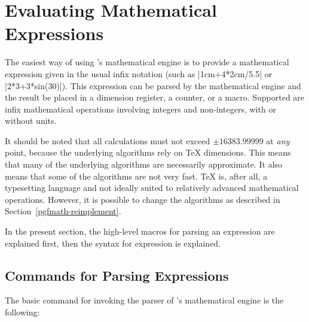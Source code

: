 %
%
%
%

\section{Evaluating Mathematical Expressions}

The easiest way of using \pgfname's mathematical engine is to provide
a mathematical expression given in the usual infix notation (such as
|1cm+4*2cm/5.5| or |2*3+3*sin(30)|). This expression can be parsed by
the mathematical engine and the result be placed in a dimension
register, a counter, or a macro. Supported are infix mathematical
operations involving integers and non-integers, with or without
units.

It should be noted that all 
calculations must not exceed $\pm16383.99999$ at \emph{any} point, 
because the underlying algorithms rely on \TeX{} dimensions. This
means that many of the underlying algorithms are necessarily
approximate. It also means that some of the algorithms are not very
fast. \TeX{} is, after all, a typesetting language and not ideally
suited to relatively advanced mathematical operations. However, it is
possible to change the algorithms as described in
Section~\ref{pgfmath-reimplement}. 

In the present section, the high-level macros for parsing an
expression are explained first, then the syntax for expression is
explained.


\subsection{Commands for Parsing Expressions}

\label{pgfmath-registers}

\label{pgfmath-parsing}

The basic command for invoking the parser of \pgfname's mathematical
engine is the following:

